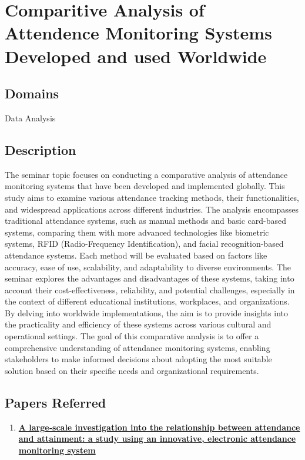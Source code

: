 \documentclass[11pt]{article}
\begin{document}
\section{Comparitive Analysis of Attendence Monitoring Systems Developed and used Worldwide}
\subsection{Domains}
Data Analysis
\subsection{Description}
The seminar topic focuses on conducting a comparative analysis of attendance monitoring systems that have been developed and implemented globally. This study aims to examine various attendance tracking methods, their functionalities, and widespread applications across different industries. The analysis encompasses traditional attendance systems, such as manual methods and basic card-based systems, comparing them with more advanced technologies like biometric systems, RFID (Radio-Frequency Identification), and facial recognition-based attendance systems. Each method will be evaluated based on factors like accuracy, ease of use, scalability, and adaptability to diverse environments. The seminar explores the advantages and disadvantages of these systems, taking into account their cost-effectiveness, reliability, and potential challenges, especially in the context of different educational institutions, workplaces, and organizations. By delving into worldwide implementations, the aim is to provide insights into the practicality and efficiency of these systems across various cultural and operational settings. The goal of this comparative analysis is to offer a comprehensive understanding of attendance monitoring systems, enabling stakeholders to make informed decisions about adopting the most suitable solution based on their specific needs and organizational requirements.

\subsection{Papers Referred}
\begin{enumerate}
    \item \href{https://www.tandfonline.com/doi/abs/10.1080/03075070802457066}{\textbf{A large‐scale investigation into the relationship between attendance and attainment: a study using an innovative, electronic attendance monitoring system}}
\end{enumerate}
\end{document}
